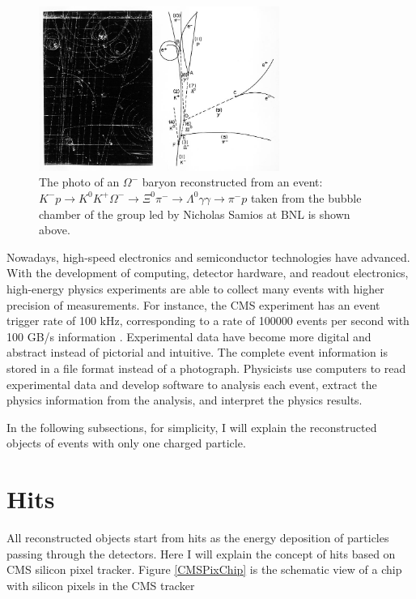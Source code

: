 \begin{figure}[hbtp]
\begin{center}
\includegraphics[width=0.70\textwidth]{Figures/Chapter4/Omega.jpg}
\caption{The photo of an $\Omega^-$ baryon reconstructed from an event: $K^- p \rightarrow K^0 K^+ \Omega^- \rightarrow \Xi^0 \pi^- \rightarrow \Lambda^0 \gamma \gamma \rightarrow \pi^- p$ taken from the bubble chamber of the group led by Nicholas Samios at BNL is shown above.}
\label{OmegaNick}
\end{center}
\end{figure} 


Nowadays, high-speed electronics and semiconductor technologies have advanced. With the development of computing, detector hardware, and readout electronics, high-energy physics experiments are able to collect many events with higher precision of measurements. For instance, the CMS experiment has an event trigger rate of 100 kHz, corresponding to a rate of 100000 events per second with 100 GB/s information \cite{CMSDAQ}. Experimental data have become more digital and abstract instead of pictorial and intuitive. The complete event information is stored in a file format instead of a photograph. Physicists use computers to read experimental data and develop software to analysis each event, extract the physics information from the analysis, and interpret the physics results. 

In the following subsections, for simplicity, I will explain the reconstructed objects of events with only one charged particle. 

\section{Hits}

All reconstructed objects start from hits as the energy deposition of particles passing through the detectors. Here I will explain the concept of hits based on CMS silicon pixel tracker. Figure \ref{CMSPixChip} is the schematic view of a chip with silicon pixels in the CMS tracker


